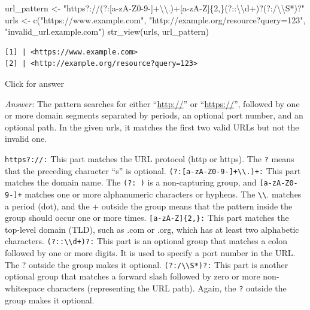 \documentclass[
]{book}
\newenvironment{Shaded}{\begin{snugshade}}{\end{snugshade}}
\newcommand{\FunctionTok}[1]{\textcolor[rgb]{0.00,0.00,0.00}{#1}}
\newcommand{\NormalTok}[1]{#1}
\newcommand{\OtherTok}[1]{\textcolor[rgb]{0.56,0.35,0.01}{#1}}
\newcommand{\SpecialCharTok}[1]{\textcolor[rgb]{0.00,0.00,0.00}{#1}}
\newcommand{\StringTok}[1]{\textcolor[rgb]{0.31,0.60,0.02}{#1}}
\begin{document}
\begin{Shaded}
\begin{Highlighting}[]
\NormalTok{url\_pattern }\OtherTok{\textless{}{-}} \StringTok{"https?://(?:[a{-}zA{-}Z0{-}9{-}]+}\SpecialCharTok{\textbackslash{}\textbackslash{}}\StringTok{.)+[a{-}zA{-}Z]\{2,\}(?::}\SpecialCharTok{\textbackslash{}\textbackslash{}}\StringTok{d+)?(?:/}\SpecialCharTok{\textbackslash{}\textbackslash{}}\StringTok{S*)?"}
\NormalTok{urls }\OtherTok{\textless{}{-}} \FunctionTok{c}\NormalTok{(}\StringTok{"https://www.example.com"}\NormalTok{, }\StringTok{"http://example.org/resource?query=123"}\NormalTok{, }\StringTok{"invalid\_url.example.com"}\NormalTok{)}
\FunctionTok{str\_view}\NormalTok{(urls, url\_pattern)}
\end{Highlighting}
\end{Shaded}

\begin{verbatim}
[1] | <https://www.example.com>
[2] | <http://example.org/resource?query=123>
\end{verbatim}

Click for answer

\emph{Answer:} The pattern searches for either ``\url{http://}'' or ``\url{https://}'', followed by one or more domain segments separated by periods, an optional port number, and an optional path. In the given urls, it matches the first two valid URLs but not the invalid one.

\texttt{https?://:} This part matches the URL protocol (http or https). The \texttt{?} means that the preceding character ``s'' is optional.
\texttt{(?:{[}a-zA-Z0-9-{]}+\textbackslash{}\textbackslash{}.)+:} This part matches the domain name. The \texttt{(?:\ )} is a non-capturing group, and \texttt{{[}a-zA-Z0-9-{]}+} matches one or more alphanumeric characters or hyphens. The \texttt{\textbackslash{}\textbackslash{}}. matches a period (dot), and the + outside the group means that the pattern inside the group should occur one or more times. \texttt{{[}a-zA-Z{]}\{2,\}:} This part matches the top-level domain (TLD), such as .com or .org, which has at least two alphabetic characters. \texttt{(?::\textbackslash{}\textbackslash{}d+)?:} This part is an optional group that matches a colon followed by one or more digits. It is used to specify a port number in the URL. The ? outside the group makes it optional. \texttt{(?:/\textbackslash{}\textbackslash{}S*)?:} This part is another optional group that matches a forward slash followed by zero or more non-whitespace characters (representing the URL path). Again, the \texttt{?} outside the group makes it optional.
\end{document}
